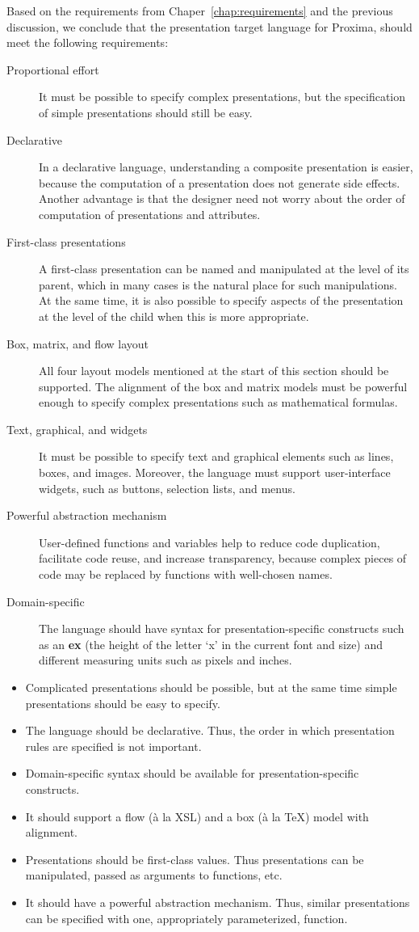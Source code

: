 Based on the requirements from Chaper~\ref{chap:requirements} and the previous discussion, we conclude that the presentation target language for Proxima, should meet the following requirements: 

\begin{description}
\item[Proportional effort]
It must be possible to specify complex presentations, but the specification of simple presentations should still be easy.
\item[Declarative]
In a declarative language, understanding a composite presentation is easier, because the computation of a presentation does not generate side effects. Another advantage is that the designer need not worry about the order of computation of presentations and attributes.
\item[First-class presentations]
A first-class presentation can be named and manipulated at the level of its parent, which in many cases is the natural place for such manipulations. At the same time, it is also possible to specify aspects of the presentation at the level of the child when this is more appropriate.
\item[Box, matrix, and flow layout]
All four layout models mentioned at the start of this section should be supported. The alignment of the box and matrix models must be powerful enough to specify complex presentations such as mathematical formulas. 
\item[Text, graphical, and widgets]
It must be possible to specify text and graphical elements such as lines, boxes, and images. Moreover, the language must support user-interface widgets, such as buttons, selection lists, and menus. 
\item[Powerful abstraction mechanism]
User-defined functions and variables help to reduce code duplication, facilitate code reuse, and increase transparency, because complex pieces of code may be replaced by functions with well-chosen names.
\item[Domain-specific]
The language should have syntax for presentation-specific constructs such as an {\bf ex} (the height of the letter `x' in the current font and size) and different measuring units such as pixels and inches.
\end{description}
\bc
\begin{itemize}
\item Complicated presentations should be possible, but at the same time simple presentations should be easy to specify.
\item The language should be declarative. Thus, the order in which presentation rules are specified is not important.
\item Domain-specific syntax should be available for presentation-specific constructs. 
\item It should support a flow (\`a la XSL) and a box (\`a la \TeX) model with alignment.
\item Presentations should be first-class values. Thus presentations can be manipulated, passed as arguments to functions, etc.
\item It should have a powerful abstraction mechanism. Thus, similar presentations can be specified with one, appropriately parameterized, function.
\end{itemize}
